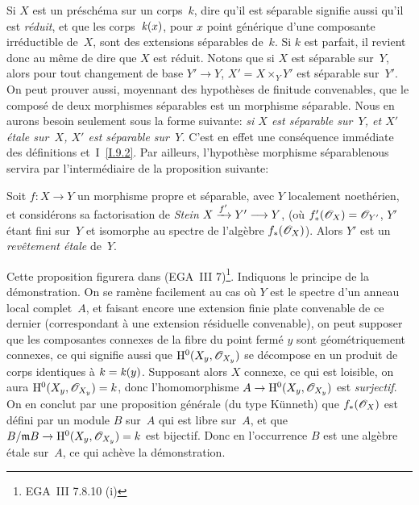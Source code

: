 Si $X$ est un pr\'esch\'ema sur un corps~$k$, dire qu'il est
s\'eparable signifie aussi qu'il est \emph{réduit}, et que les
corps~$\mathit{k}(x)$, pour $x$ point g\'en\'erique d'une composante
irr\'eductible de~$X$, sont des extensions s\'eparables de~$k$. Si
$k$ est parfait, il revient donc au m\^eme de dire que $X$ est
r\'eduit. Notons que si $X$ est s\'eparable sur~$Y$, alors pour
tout changement de base $Y'\to Y$, $X'=X\times_Y Y'$ est s\'eparable
sur~$Y'$. On peut prouver aussi, moyennant des hypoth\`eses de
finitude convenables, que le compos\'e de deux morphismes
s\'eparables est
un morphisme s\'eparable. Nous en aurons besoin seulement sous la
forme suivante: \emph{si $X$ est séparable sur~$Y$, et $X'$
étale sur~$X$, $X'$ est séparable sur~$Y$.} C'est en effet
une cons\'equence imm\'ediate des d\'efinitions
et~I~\ref{I.9.2}. Par ailleurs, l'hypoth\`ese \og morphisme
s\'eparable\fg nous servira par l'interm\'ediaire de la proposition
suivante:
\begin{proposition}
\label{X.1.2}
Soit $f\colon X\to Y$ un morphisme propre et s\'eparable, avec $Y$
localement noeth\'erien, et consid\'erons sa factorisation de
\emph{Stein} $X\lto{f'}Y'\dpl\to Y$, (o\`u
$f_*'(\cal{O}_X)=\cal{O}_{Y'}$, $Y'$ \'etant fini sur~$Y$ et
isomorphe au spectre de l'alg\`ebre $f_*(\cal{O}_X)$). Alors $Y'$
est un \emph{revêtement étale} de~$Y$.
\end{proposition}

Cette proposition figurera dans (EGA~III 7)\footnote{\Cf EGA~III
7.8.10 (i)}. Indiquons le principe de la d\'emonstration. On se
ram\`ene facilement au cas o\`u $Y$ est le spectre d'un anneau
local complet~$A$, et faisant encore une extension finie plate
convenable de ce dernier (correspondant \`a une extension
r\'esiduelle convenable), on peut supposer que les composantes
connexes de la fibre du point ferm\'e $y$ sont
g\'eom\'etriquement connexes, ce qui signifie aussi que
$\H^0(X_y,\cal{O}_{X_y})$ se d\'ecompose en un produit de corps
identiques \`a $k=\mathit{k}(y)$. Supposant alors $X$ connexe, ce qui est
loisible, on aura $\H^0(X_y,\cal{O}_{X_y})=k$, donc l'homomorphisme
$A\to \H^0(X_y,\cal{O}_{X_y})$ est \emph{surjectif}. On en conclut par
une proposition g\'en\'erale (du type K\"unneth) que
$f_*(\cal{O}_X)$ est d\'efini par un module $B$ sur~$A$ qui est
libre sur~$A$, et que $B/\goth{m} B\to \H^0(X_y,\cal{O}_{X_y})=k$ est
bijectif. Donc en l'occurrence $B$ est une alg\`ebre \'etale
sur~$A$, ce qui ach\`eve la d\'emonstration.

